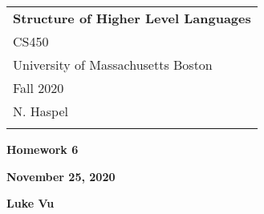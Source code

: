 \documentclass[a4paper,12pt]{article}
\begin{document}
	\thispagestyle{empty}
	
	\begin{tabular}{p{15.5cm}}
		{\large \bf Structure of Higher Level Languages} \\ CS450 \\
		University of Massachusetts Boston \\ Fall 2020  \\ N. Haspel\\
		\hline
		\\
	\end{tabular}

	\vspace*{0.1cm}
	
	\begin{center}
		{\Large \bf Homework 6}
		\vspace{1mm}
		
		{\bf November 25, 2020}
		\vspace{1mm}
		
		{\bf Luke Vu}	
	\end{center} 

	\vspace*{0.5cm}
	
\end{document}
